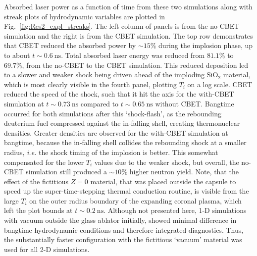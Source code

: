 Absorbed laser power as a function of time from these two simulations along with streak plots of hydrodynamic variables are plotted in Fig.~\ref{fig:Res2_expl_streaks}.
The left column of panels is from the no-\ac{CBET} simulation and the right is from the \ac{CBET} simulation.
The top row demonstrates that \ac{CBET} reduced the absorbed power by $\sim15\%$ during the implosion phase, up to about $t\sim0.6\ \text{ns}$.
Total absorbed laser energy was reduced from $81.1\%$ to $69.7\%$, from the no-\ac{CBET} to the \ac{CBET} simulation.
This reduced deposition led to a slower and weaker shock being driven ahead of the imploding $\text{SiO}_2$ material, which is most clearly visible in the fourth panel, plotting $T_i$ on a log scale.
\ac{CBET} reduced the speed of the shock, such that it hit the axis for the with-\ac{CBET} simulation at $t\sim0.73\ \text{ns}$ compared to $t\sim0.65\ \text{ns}$ without \ac{CBET}.
Bangtime occurred for both simulations after this `shock-flash', as the rebounding deuterium fuel compressed against the in-falling shell, creating thermonuclear densities.
Greater densities are observed for the with-\ac{CBET} simulation at bangtime, because the in-falling shell collides the rebounding shock at a smaller radius, \textit{i.e.} the shock timing of the implosion is better.
This somewhat compensated for the lower $T_i$ values due to the weaker shock, but overall, the no-\ac{CBET} simulation still produced a $\sim10\%$ higher neutron yield.
Note, that the effect of the fictitious $Z=0$ material, that was placed outside the capsule to speed up the super-time-stepping thermal conduction routine, is visible from the large $T_i$ on the outer radius boundary of the expanding coronal plasma, which left the plot bounds at $t\sim0.2\ \text{ns}$.
Although not presented here, 1-D simulations with vacuum outside the glass ablator initially, showed minimal difference in bangtime hydrodynamic conditions and therefore integrated diagnostics.
Thus, the substantially faster configuration with the fictitious `vacuum' material was used for all 2-D simulations.

